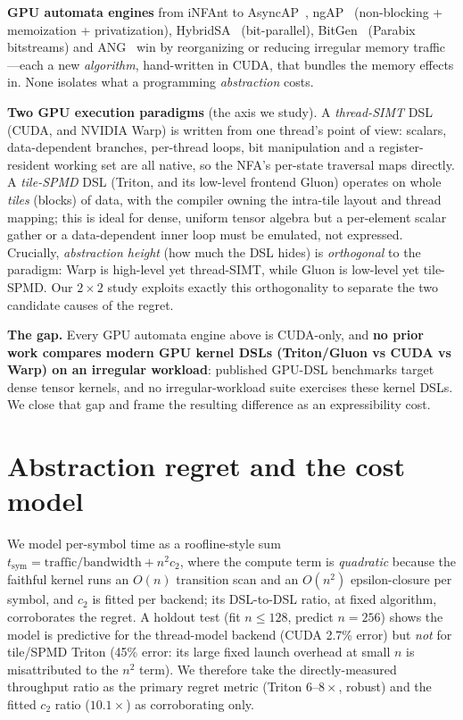 \documentclass[conference]{IEEEtran}
\begin{document}
\textbf{GPU automata engines} from iNFAnt to AsyncAP~\cite{asyncap}, ngAP~\cite{ngap}
(non-blocking + memoization + privatization), HybridSA~\cite{hybridsa} (bit-parallel),
BitGen~\cite{bitgen} (Parabix bitstreams) and ANG~\cite{ang} win by reorganizing or reducing
irregular memory traffic---each a new \emph{algorithm}, hand-written in CUDA, that bundles the
memory effects in. None isolates what a programming \emph{abstraction} costs.

\textbf{Two GPU execution paradigms} (the axis we study). A \emph{thread-SIMT} DSL (CUDA, and
NVIDIA Warp) is written from one thread's point of view: scalars, data-dependent branches,
per-thread loops, bit manipulation and a register-resident working set are all native, so the
NFA's per-state traversal maps directly. A \emph{tile-SPMD} DSL (Triton, and its low-level
frontend Gluon) operates on whole \emph{tiles} (blocks) of data, with the compiler owning the
intra-tile layout and thread mapping; this is ideal for dense, uniform tensor algebra but a
per-element scalar gather or a data-dependent inner loop must be emulated, not expressed.
Crucially, \emph{abstraction height} (how much the DSL hides) is \emph{orthogonal} to the
paradigm: Warp is high-level yet thread-SIMT, while Gluon is low-level yet tile-SPMD. Our $2\times2$
study exploits exactly this orthogonality to separate the two candidate causes of the regret.

\textbf{The gap.} Every GPU automata engine above is CUDA-only, and \textbf{no prior work
compares modern GPU kernel DSLs (Triton/Gluon vs CUDA vs Warp) on an irregular workload}:
published GPU-DSL benchmarks target dense tensor kernels, and no irregular-workload suite
exercises these kernel DSLs. We close that gap and frame the resulting difference as an
expressibility cost.

\section{Abstraction regret and the cost model}\label{sec:cost}
We model per-symbol time as a roofline-style sum $t_{\text{sym}} =
\text{traffic}/\text{bandwidth} + n^2 c_2$, where the compute term is \emph{quadratic} because
the faithful kernel runs an $O(n)$ transition scan and an $O(n^2)$ epsilon-closure per symbol,
and $c_2$ is fitted per backend; its DSL-to-DSL ratio, at fixed algorithm, corroborates the
regret. A holdout test (fit $n\!\le\!128$, predict $n{=}256$) shows the model is predictive for
the thread-model backend (CUDA 2.7\% error) but \emph{not} for tile/SPMD Triton (45\% error:
its large fixed launch overhead at small $n$ is misattributed to the $n^2$ term). We therefore
take the directly-measured throughput ratio as the primary regret metric (Triton $6$--$8\times$,
robust) and the fitted $c_2$ ratio ($10.1\times$) as corroborating only.
\end{document}
